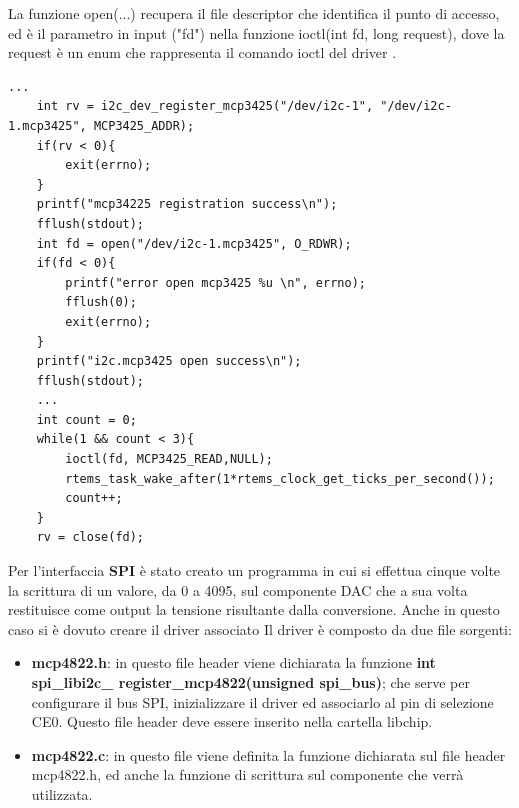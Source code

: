 \documentclass[12pt, a4paper, titlepage, oneside]{book}
\begin{document}
La funzione open(...) recupera il file descriptor che identifica il punto di accesso, ed è il parametro in input ("fd")  nella funzione ioctl(int fd, long request), dove la request è un enum che rappresenta il comando ioctl del driver .\newline
\begin{lstlisting}[style = CStyle]
    ...
	int rv = i2c_dev_register_mcp3425("/dev/i2c-1", "/dev/i2c-1.mcp3425", MCP3425_ADDR);
	if(rv < 0){
		exit(errno);
	}
	printf("mcp34225 registration success\n");
	fflush(stdout);
	int fd = open("/dev/i2c-1.mcp3425", O_RDWR);
	if(fd < 0){
		printf("error open mcp3425 %u \n", errno);
		fflush(0);
		exit(errno);
	}
	printf("i2c.mcp3425 open success\n");
	fflush(stdout);
	...
	int count = 0;
	while(1 && count < 3){
		ioctl(fd, MCP3425_READ,NULL);
		rtems_task_wake_after(1*rtems_clock_get_ticks_per_second());
		count++;
	}
	rv = close(fd);
\end{lstlisting}

\newpage
Per l'interfaccia \textbf{SPI} è stato creato un programma in cui si effettua cinque volte la scrittura di un valore, da 0 a  4095, sul componente DAC che a sua volta restituisce come output la tensione risultante dalla conversione. Anche in questo caso si è dovuto creare il driver associato \newline
Il driver è composto da due file sorgenti:
\begin{itemize}
    \item\textbf{mcp4822.h}: in questo file header viene dichiarata la funzione \textbf{int spi\_libi2c\_ \newline register\_mcp4822(unsigned spi\_bus)}; che serve per configurare il bus SPI, inizializzare il driver ed associarlo al pin di selezione CE0.
    Questo file header deve essere inserito nella cartella libchip.
    \item\textbf{mcp4822.c}: in questo file viene definita la funzione dichiarata sul file header mcp4822.h, ed anche la funzione di scrittura sul componente che verrà utilizzata.
\end{itemize}
\end{document}

